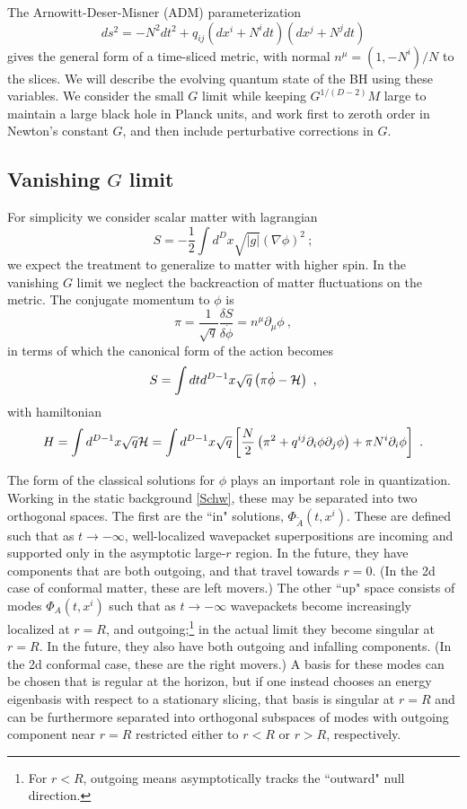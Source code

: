 \documentclass[11pt]{article}
\numberwithin{equation}{section}
\newcommand{\calh}{{\cal H}}
\newcommand{\beq}{\begin{equation}}
\newcommand{\eeq}{\end{equation}}
\newcommand{\hf}{\frac{1}{2}}
\begin{document}
The Arnowitt-Deser-Misner (ADM) parameterization\cite{ADM}
\beq
ds^2= -N^2 dt^2 + q_{ij}(dx^i + N^i dt)(dx^j + N^j dt)
\eeq
gives the general form of a time-sliced metric, with normal $n^\mu=(1,-N^i)/N$ to the slices.  We will describe the evolving quantum state of the BH using these variables.  We consider  the small $G$ limit while keeping $G^{1/(D-2)}M$ large to maintain a large black hole in Planck units,
and work first to zeroth order in Newton's constant $G$, and then include perturbative corrections in $G$.


\subsection{Vanishing $G$ limit}
\label{Gez}

 For simplicity we consider scalar matter with lagrangian
\beq
S=-\hf \int d^D x \sqrt{|g|} (\nabla\phi)^2 \ ;
\eeq
we expect the treatment to generalize to matter with higher spin.  In the vanishing $G$ limit we neglect the backreaction of matter fluctuations on the metric.  The conjugate momentum to $\phi$ is 
\beq
\pi= \frac{1}{\sqrt q}\frac{\delta S}{\delta \dot\phi} =  n^\mu\partial_\mu \phi\ ,
\eeq
in terms of which the canonical form of the action becomes
\beq
S=\int dt d^{D-1}x \sqrt q \left(\pi \dot\phi  - \calh\right)\ ,
\eeq
with hamiltonian
\beq\label{matH}
H =  \int d^{D-1} x \sqrt q \calh= \int d^{D-1} x \sqrt q \left[ \frac{N}{2}\left(\pi^2+q^{ij}\partial_i\phi \partial_j\phi\right) + \pi N^i \partial_i\phi \right] \ .
\eeq 

The form of the classical solutions for $\phi$ plays an important role in  quantization.  Working in the static background \eqref{Schw}, these may be separated into two orthogonal spaces\cite{GiPe1}.  The first are the ``in" solutions, $\Phi_{\tilde A}(t,x^i)$.  These are defined such that as $t\rightarrow-\infty$, well-localized wavepacket superpositions 
are incoming and supported only in the asymptotic large-$r$ region.  In the future, they have components that are both outgoing, and that travel towards $r=0$.  (In the 2d case of conformal matter, these are left movers.)  The other ``up" space consists of modes $\Phi_A(t,x^i)$ such that as $t\rightarrow-\infty$ wavepackets become increasingly localized at $r=R$, and outgoing;\footnote{For $r<R$, outgoing means asymptotically tracks the ``outward" null direction.} in the actual limit they become singular at $r=R$.  In the future, they also have both outgoing and infalling components.  (In the 2d conformal case, these are the right movers.)  A basis for these modes can be chosen that is regular at the horizon, but if one instead chooses an energy eigenbasis with respect to a stationary slicing, that basis is singular at $r=R$ and can be furthermore separated into orthogonal subspaces of modes with outgoing component near $r=R$ restricted either to $r<R$ or $r>R$, respectively\cite{GiPe1}.
\end{document}
